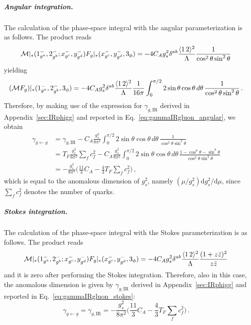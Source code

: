 \subparagraph{Angular integration.}
%
The calculation of the phase-space integral with the angular parameterization is as follows.
The product reads
\begin{equation}
    \mathcal M|_*(1^-_{g^a},2^-_{g^b};x^{-}_{g^c},y^{-}_{g^d})F_g|_*(x^{-}_{g^c},y^{-}_{g^d},3_\phi) = -4C_Ag_s^2 \delta^{ab} \frac{\langle1\, 2 \rangle^2}{\Lambda} \frac{1}{\cos^2\theta \sin^2\theta}
\end{equation}
yielding
\begin{equation}
    (\mathcal M F_g)|_*(1^-_{g^a},2^-_{g^b},3_\phi) = -4C_Ag_s^2 \delta^{ab} \frac{\langle1\, 2 \rangle^2}{\Lambda} \frac{1}{16\pi}\int_0^{\pi/2}2 \sin\theta\cos\theta\,d\theta\, \frac{1}{\cos^2\theta \sin^2\theta}\,.
\end{equation}
Therefore, by making use of the expression for $\gamma_{g,\text{IR}}$ derived in Appendix~\ref{sec:IRphigg} and reported in Eq.~\eqref{eq:gammaIRgluon_angular}, we obtain
\begin{align}
    \gamma_{g\leftarrow g} &= \gamma_{g,\text{IR}} - C_A\frac{g_s^2}{8\pi^2}  \int_0^{\pi/2}2\sin\theta\cos\theta \, d\theta \, \frac{1}{\cos^2\theta\sin^2\theta}\nonumber \\
    &= T_F\frac{g_s^2}{6\pi^2}\sum_f c_f^2 - C_A\frac{g_s^2}{8\pi^2}  \int_0^{\pi/2}2\sin\theta\cos\theta \, d\theta \, \frac{1 -\cos^8\theta- \sin^8\theta}{\cos^2\theta\sin^2\theta}\nonumber \\
    &= -\frac{g_s^2}{8\pi^2}\bigg(\frac{11}{3}C_A -\frac{4}{3}T_F\sum_fc_f^2\bigg)\,,
\end{align}
which is equal to the anomalous dimension of $g_s^2$, namely $(\mu/g_s^2)\text{d}g_s^2/\text{d}\mu$, since $\sum_f c_f^2$ denotes the number of quarks. 

\subparagraph{Stokes integration.}
The calculation of the phase-space integral with the Stokes parameterization is as follows.
The product reads
\begin{equation}
    \mathcal M|_*(1^-_{g^a},2^-_{g^b};x^{-}_{g^c},y^{-}_{g^d})F_g|_*(x^{-}_{g^c},y^{-}_{g^d},3_\phi) = -4C_Ag_s^2 \delta^{ab} \frac{\langle1\, 2 \rangle^2}{\Lambda} \frac{(1+z\bar{z})^2}{z\bar{z} }
\end{equation}
and it is zero after performing the Stokes integration.
Therefore, also in this case, the anomalous dimension is given by $\gamma_{g,\text{IR}}$ derived in Appendix~\ref{sec:IRphigg} and reported in Eq.~\eqref{eq:gammaIRgluon_stokes}:
\begin{equation}
    \gamma_{g\leftarrow g} = \gamma_{g,\text{IR}}
    = -\frac{g_s^2}{8\pi^2}\bigg(\frac{11}{3}C_A -\frac{4}{3}T_F\sum_fc_f^2\bigg)\,.
\end{equation}

